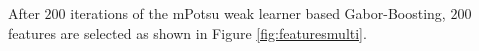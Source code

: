 After $200$ iterations of the mPotsu weak learner based Gabor-Boosting, $200$ features are selected as shown in \mbox{Figure} \ref{fig:featuresmulti}.
\begin{figure}[ht]
 \begin{center}

\end{center}
\end{figure}
